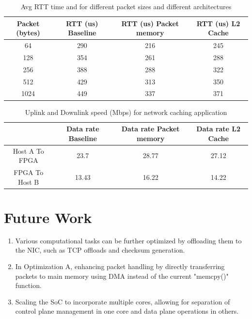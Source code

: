 \documentclass[12pt]{report}
\begin{document}
\begin{table}[h!]
\caption{Avg RTT time and for different  packet sizes and different architectures}
\begin{center}
\begin{tabular}{|c|c|c|c|}

\hline
\textbf{Packet (bytes)}
& \textbf{RTT (us) Baseline} 
& \textbf{RTT (us) Packet memory}  
& \textbf{RTT (us) L2 Cache}  \\
\hline
64 & 290 & 216   &  245 \\
\hline
128 & 354 &  261  & 288  \\
\hline
256 & 388 &  288  & 322  \\
\hline
512 & 429  &  313  & 350 \\
\hline
1024 & 449 &  337  &  371  \\
\hline
\end{tabular}
\label{table_dataRate3}
\end{center}
\end{table}


\begin{table}[h!]
\caption{Uplink and Downlink speed (Mbps) for network caching application}
\begin{center}
\begin{tabular}{|c|c|c|c|}

\hline
\textbf{}
& \textbf{Data rate Baseline} 
& \textbf{Data rate Packet memory}  
& \textbf{Data rate L2 Cache}  \\
\hline
Host A To FPGA & 23.7 & 28.77   &  27.12 \\
\hline
FPGA To Host B & 13.43 &  16.22  & 14.22  \\
\hline

\hline
\end{tabular}
\label{table_dataRate4}
\end{center}
\end{table}


\newpage
\section{Future Work}
\begin{enumerate}
    \item Various computational tasks can be further optimized by offloading them to the NIC, such as TCP offloads and checksum generation.
    \item In Optimization A, enhancing packet handling by directly transferring packets to main memory using DMA instead of the current "memcpy()" function.
    \item Scaling the SoC to incorporate multiple cores, allowing for separation of control plane management in one core and data plane operations in others.
   
\end{enumerate}
\end{document}
